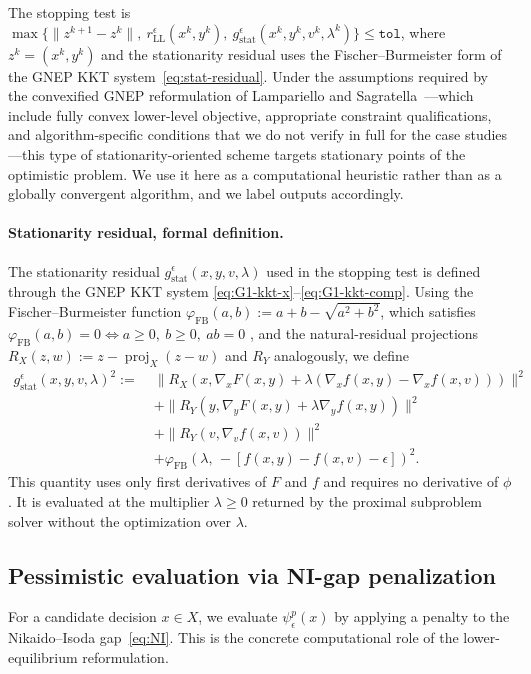 \documentclass[11pt]{article}
\theoremstyle{definition}
\newcommand{\eps}{\epsilon}
\DeclareMathOperator{\proj}{proj}
\begin{document}
The stopping test is
$\max\{\|z^{k+1}-z^k\|,\ r_\mathrm{LL}^\eps(x^k,y^k),\
g_\mathrm{stat}^\eps(x^k,y^k,v^k,\lambda^k)\}\le\texttt{tol}$,
where $z^k=(x^k,y^k)$ and the stationarity residual uses the
Fischer--Burmeister form of the GNEP KKT
system~\eqref{eq:stat-residual}. Under the assumptions required
by the convexified GNEP reformulation of Lampariello and
Sagratella~\cite{lampariello2020numerically}---which include
fully convex lower-level objective, appropriate constraint
qualifications, and algorithm-specific conditions that we do not
verify in full for the case studies---this type of
stationarity-oriented scheme targets stationary points of the
optimistic problem. We use it here as a computational heuristic
rather than as a globally convergent algorithm, and we label
outputs accordingly.

\paragraph{Stationarity residual, formal definition.}
The stationarity residual $g_\mathrm{stat}^\eps(x,y,v,\lambda)$
used in the stopping test is defined through the GNEP KKT system
\eqref{eq:G1-kkt-x}--\eqref{eq:G1-kkt-comp}. Using the
Fischer--Burmeister function
$\varphi_{\mathrm{FB}}(a,b):=a+b-\sqrt{a^2+b^2}$, which satisfies
$\varphi_{\mathrm{FB}}(a,b)=0\iff a\ge 0,\ b\ge 0,\ ab=0$
\cite{fischer1992special,facchinei2003finite}, and the natural-residual
projections $R_X(z,w):=z-\proj_X(z-w)$ and $R_Y$ analogously, we
define
\begin{equation}\label{eq:stat-residual}
\begin{aligned}
  g_\mathrm{stat}^\eps(x,y,v,\lambda)^2
  :=\;& \|R_X(x,\nabla_x F(x,y)
        +\lambda(\nabla_x f(x,y)-\nabla_x f(x,v)))\|^2\\
  & + \|R_Y(y,\nabla_y F(x,y)+\lambda\nabla_y f(x,y))\|^2\\
  & + \|R_Y(v,\nabla_v f(x,v))\|^2\\
  & + \varphi_{\mathrm{FB}}(\lambda,\,-[f(x,y)-f(x,v)-\eps])^2.
\end{aligned}
\end{equation}
This quantity uses only first derivatives of $F$ and $f$ and
requires no derivative of $\phi$. It is evaluated at the
multiplier $\lambda\ge 0$ returned by the proximal subproblem
solver without the optimization over $\lambda$.

\subsection{Pessimistic evaluation via NI-gap penalization}
\label{sec:algo-pess}
For a candidate decision $x\in X$, we evaluate $\psi_\eps^p(x)$ by
applying a penalty to the Nikaido--Isoda gap~\eqref{eq:NI}. This
is the concrete computational role of the lower-equilibrium
reformulation.
\end{document}
